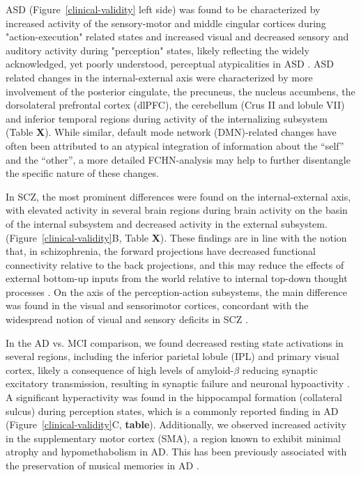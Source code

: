 \documentclass{article}
\begin{document}
ASD (Figure~\ref{clinical-validity} left side) was found to be characterized by increased activity of the sensory-motor and middle cingular cortices during "action-execution" related states and increased visual and decreased sensory and auditory activity during "perception" states, likely reflecting the widely acknowledged, yet poorly understood, perceptual atypicalities in ASD \citep{hadad2019perception}.
ASD related changes in the internal-external axis were characterized by more involvement of the posterior cingulate, the precuneus, the nucleus accumbens, the dorsolateral prefrontal cortex (dlPFC), the cerebellum (Crus II and lobule VII) and inferior temporal regions during activity of the internalizing subsystem (Table \textbf{X}). While similar, default mode network (DMN)-related changes have often been attributed to an atypical integration of information about the ``self'' and the ``other'', a more detailed FCHN-analysis may help to further disentangle the specific nature of these changes.

In SCZ, the most prominent differences were found on the internal-external axis, with elevated activity in several brain regions during brain activity on the basin of the internal subsystem and decreased activity in the external subsystem. (Figure~\ref{clinical-validity}B, Table \textbf{X}). These findings are in line with the notion that, in schizophrenia, the forward projections have decreased functional connectivity relative to the back projections, and this may reduce the effects of external bottom-up inputs from the world relative to internal top-down thought processes \citep{rolls2021attractor}.
On the axis of the perception-action subsystems, the main difference was found in the visual and sensorimotor cortices, concordant with the widespread notion of visual and sensory deficits in SCZ \citep{javitt2009sensory, butler2008visual, adamek2022early}.

In the AD vs. MCI comparison, we found decreased resting state activations in several regions, including the inferior parietal lobule (IPL) and primary visual cortex, likely a consequence of high levels of amyloid-$\beta$ reducing synaptic excitatory transmission, resulting in synaptic failure and neuronal hypoactivity \citep{selkoe2002alzheimer}. A significant hyperactivity was found in the hippocampal formation (collateral sulcus) during perception states, which is
a commonly reported finding in AD \citep{aizenstein2015hippocampal, ewers2011neuroimaging}
(Figure~\ref{clinical-validity}C, \textbf{table}). Additionally, we observed increased activity in the supplementary motor cortex (SMA), a region known to exhibit minimal atrophy and hypomethabolism in AD. This has been previously associated with the preservation of musical memories in AD \citep{jacobsen2015musical}.
\end{document}
